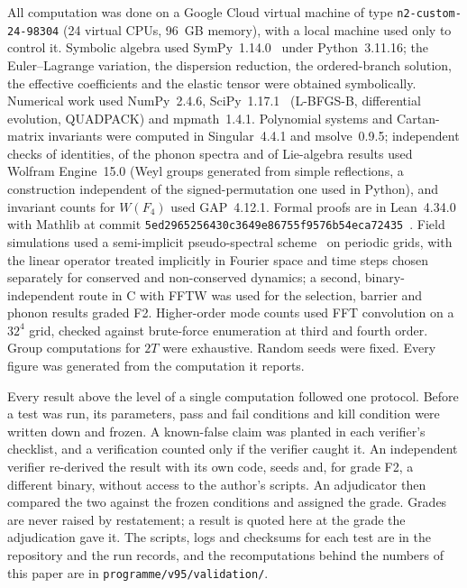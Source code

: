 \documentclass[a4paper,11pt]{article}
\numberwithin{equation}{section}
\theoremstyle{jsplain}
\theoremstyle{jsrem}
\begin{document}
All computation was done on a Google Cloud virtual machine of type \texttt{n2-custom-24-98304} (24 virtual CPUs, 96~GB memory), with a local machine used only to control it. Symbolic algebra used SymPy~1.14.0~\cite{ref36} under Python~3.11.16; the Euler--Lagrange variation, the dispersion reduction, the ordered-branch solution, the effective coefficients and the elastic tensor were obtained symbolically. Numerical work used NumPy~2.4.6, SciPy~1.17.1~\cite{ref11} (L-BFGS-B, differential evolution, QUADPACK) and mpmath~1.4.1. Polynomial systems and Cartan-matrix invariants were computed in Singular~4.4.1 and msolve~0.9.5; independent checks of identities, of the phonon spectra and of Lie-algebra results used Wolfram Engine~15.0 (Weyl groups generated from simple reflections, a construction independent of the signed-permutation one used in Python), and invariant counts for $W(F_4)$ used GAP~4.12.1. Formal proofs are in Lean~4.34.0 with Mathlib at commit \texttt{5ed2965256430c3649e86755f9576b54eca72435}~\cite{ref34,ref35}. Field simulations used a semi-implicit pseudo-spectral scheme~\cite{ref10} on periodic grids, with the linear operator treated implicitly in Fourier space and time steps chosen separately for conserved and non-conserved dynamics; a second, binary-independent route in C with FFTW was used for the selection, barrier and phonon results graded F2. Higher-order mode counts used FFT convolution on a $32^4$ grid, checked against brute-force enumeration at third and fourth order. Group computations for $2T$ were exhaustive. Random seeds were fixed. Every figure was generated from the computation it reports.

Every result above the level of a single computation followed one protocol. Before a test was run, its parameters, pass and fail conditions and kill condition were written down and frozen. A known-false claim was planted in each verifier's checklist, and a verification counted only if the verifier caught it. An independent verifier re-derived the result with its own code, seeds and, for grade F2, a different binary, without access to the author's scripts. An adjudicator then compared the two against the frozen conditions and assigned the grade. Grades are never raised by restatement; a result is quoted here at the grade the adjudication gave it. The scripts, logs and checksums for each test are in the repository and the run records, and the recomputations behind the numbers of this paper are in \texttt{programme/v95/validation/}.

\end{document}
